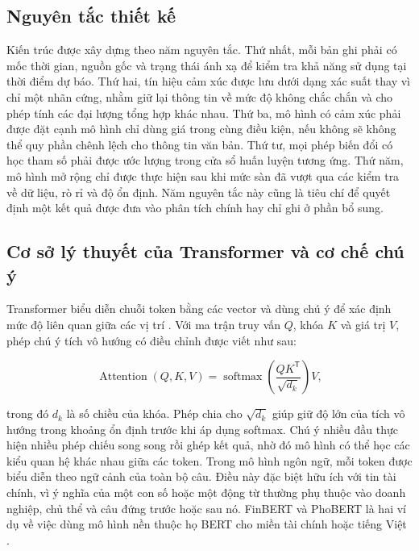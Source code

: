 \subsection{Nguyên tắc thiết kế}

Kiến trúc được xây dựng theo năm nguyên tắc. Thứ nhất, mỗi bản ghi phải có mốc thời
gian, nguồn gốc và trạng thái ánh xạ để kiểm tra khả năng sử dụng tại thời điểm dự báo.
Thứ hai, tín hiệu cảm xúc được lưu dưới dạng xác suất thay vì chỉ một nhãn cứng, nhằm
giữ lại thông tin về mức độ không chắc chắn và cho phép tính các đại lượng tổng hợp
khác nhau. Thứ ba, mô hình có cảm xúc phải được đặt cạnh mô hình chỉ dùng giá trong
cùng điều kiện, nếu không sẽ không thể quy phần chênh lệch cho thông tin văn bản. Thứ
tư, mọi phép biến đổi có học tham số phải được ước lượng trong cửa sổ huấn luyện tương
ứng. Thứ năm, mô hình mở rộng chỉ được thực hiện sau khi mức sàn đã vượt qua các kiểm
tra về dữ liệu, rò rỉ và độ ổn định. Năm nguyên tắc này cũng là tiêu chí để quyết định
một kết quả được đưa vào phân tích chính hay chỉ ghi ở phần bổ sung.

\subsection{Cơ sở lý thuyết của Transformer và cơ chế chú ý}

Transformer biểu diễn chuỗi token bằng các vector và dùng chú ý để xác định mức độ
liên quan giữa các vị trí \cite{Vaswani2017_attention}. Với ma trận truy vấn $Q$, khóa
$K$ và giá trị $V$, phép chú ý tích vô hướng có điều chỉnh được viết như sau:

\begin{equation}
  \operatorname{Attention}(Q,K,V)=
  \operatorname{softmax}\left(\frac{QK^{\mathsf{T}}}{\sqrt{d_k}}\right)V,
  \label{eq:scaled-attention}
\end{equation}

trong đó $d_k$ là số chiều của khóa. Phép chia cho $\sqrt{d_k}$ giúp giữ độ lớn của
tích vô hướng trong khoảng ổn định trước khi áp dụng softmax. Chú ý nhiều đầu thực
hiện nhiều phép chiếu song song rồi ghép kết quả, nhờ đó mô hình có thể học các kiểu
quan hệ khác nhau giữa các token. Trong mô hình ngôn ngữ, mỗi token được biểu diễn
theo ngữ cảnh của toàn bộ câu. Điều này đặc biệt hữu ích với tin tài chính, vì ý nghĩa
của một con số hoặc một động từ thường phụ thuộc vào doanh nghiệp, chủ thể và câu đứng
trước hoặc sau nó. FinBERT và PhoBERT là hai ví dụ về việc dùng mô hình nền thuộc họ
BERT cho miền tài chính hoặc tiếng Việt \cite{Devlin2019_bert,Yang2020_200608097v2,
Nguyen2020_200300744v3}.

